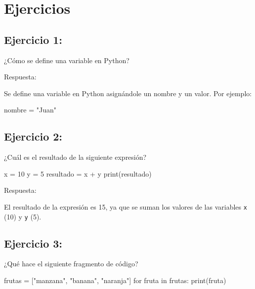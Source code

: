 \documentclass[
  a4paper,
  DIV=11,
  numbers=noendperiod,
  onepage,
  openany]{scrreprt}
\newenvironment{Shaded}{\begin{snugshade}}{\end{snugshade}}
\newcommand{\BuiltInTok}[1]{\textcolor[rgb]{0.00,0.23,0.31}{#1}}
\newcommand{\ControlFlowTok}[1]{\textcolor[rgb]{0.00,0.23,0.31}{#1}}
\newcommand{\DecValTok}[1]{\textcolor[rgb]{0.68,0.00,0.00}{#1}}
\newcommand{\KeywordTok}[1]{\textcolor[rgb]{0.00,0.23,0.31}{#1}}
\newcommand{\NormalTok}[1]{\textcolor[rgb]{0.00,0.23,0.31}{#1}}
\newcommand{\OperatorTok}[1]{\textcolor[rgb]{0.37,0.37,0.37}{#1}}
\newcommand{\StringTok}[1]{\textcolor[rgb]{0.13,0.47,0.30}{#1}}
\begin{document}
\part{Ejercicios}

\chapter{Ejercicio 1:}\label{ejercicio-1}

¿Cómo se define una variable en Python?

Respuesta:

Se define una variable en Python asignándole un nombre y un valor. Por
ejemplo:

\begin{Shaded}
\begin{Highlighting}[]
\NormalTok{nombre }\OperatorTok{=} \StringTok{"Juan"}
\end{Highlighting}
\end{Shaded}

\chapter{Ejercicio 2:}\label{ejercicio-2}

¿Cuál es el resultado de la siguiente expresión?

\begin{Shaded}
\begin{Highlighting}[]
\NormalTok{x }\OperatorTok{=} \DecValTok{10}
\NormalTok{y }\OperatorTok{=} \DecValTok{5}
\NormalTok{resultado }\OperatorTok{=}\NormalTok{ x }\OperatorTok{+}\NormalTok{ y}
\BuiltInTok{print}\NormalTok{(resultado)}
\end{Highlighting}
\end{Shaded}

Respuesta:

El resultado de la expresión es 15, ya que se suman los valores de las
variables \texttt{x} (10) y \texttt{y} (5).

\chapter{Ejercicio 3:}\label{ejercicio-3}

¿Qué hace el siguiente fragmento de código?

\begin{Shaded}
\begin{Highlighting}[]
\NormalTok{frutas }\OperatorTok{=}\NormalTok{ [}\StringTok{"manzana"}\NormalTok{, }\StringTok{"banana"}\NormalTok{, }\StringTok{"naranja"}\NormalTok{]}
\ControlFlowTok{for}\NormalTok{ fruta }\KeywordTok{in}\NormalTok{ frutas:}
    \BuiltInTok{print}\NormalTok{(fruta)}
\end{Highlighting}
\end{Shaded}
\end{document}
